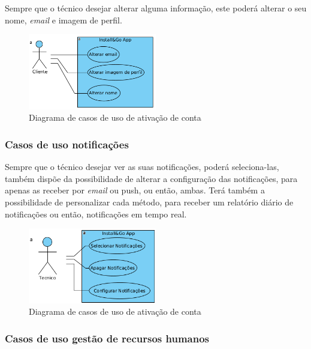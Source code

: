 Sempre que o técnico desejar alterar alguma informação, este poderá alterar o seu nome, \textit{email} e imagem de perfil.

\begin{figure}[htb]
    \centering
    
    \includegraphics[width=0.5\textwidth]{images/diagramas/casos_de_uso/use_case_perfil.png}
    \caption{Diagrama de casos de uso de ativação de conta}
    \label{fig:17}
\end{figure}

\newpage

\subsubsection{Casos de uso notificações}

Sempre que o técnico desejar ver as suas notificações, poderá seleciona-las, também dispõe da possibilidade de alterar a configuração das notificações, para apenas as receber por \textit{email} ou push, ou então, ambas. Terá também a possibilidade de personalizar cada método, para receber um relatório diário de notificações ou então, notificações em tempo real.

\begin{figure}[htb]
    \centering
    \includegraphics[width=0.5\textwidth]{images/diagramas/casos_de_uso/use_case_notificacoes.png}
    \caption{Diagrama de casos de uso de ativação de conta}
    \label{fig:18}
\end{figure}

\subsubsection{Casos de uso gestão de recursos humanos}

